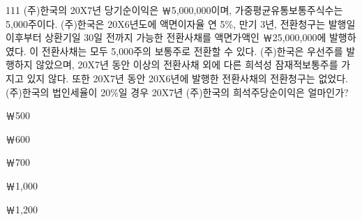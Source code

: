 \begin{question}{111}
(주)한국의 20X7년 당기순이익은 ￦5,000,000이며, 가중평균유통보통주식수는 5,000주이다. (주)한국은 20X6년도에 액면이자율 연 5\%, 만기 3년, 전환청구는 발행일 이후부터 상환기일 30일 전까지 가능한 전환사채를 액면가액인 ￦25,000,000에 발행하였다. 이 전환사채는 모두 5,000주의 보통주로 전환할 수 있다. (주)한국은 우선주를 발행하지 않았으며, 20X7년 동안 이상의 전환사채 외에 다른 희석성 잠재적보통주를 가지고 있지 않다. 또한 20X7년 동안 20X6년에 발행한 전환사채의 전환청구는 없었다. (주)한국의 법인세율이 20\%일 경우 20X7년 (주)한국의 희석주당순이익은 얼마인가?
\begin{choices}
  \item ￦500
  \item ￦600
  \item ￦700
  \item ￦1,000
  \item ￦1,200
\end{choices}
\end{question}
\answerall
{}
